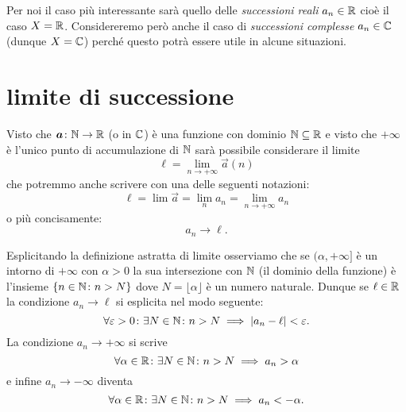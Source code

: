 Per noi il caso più interessante sarà quello delle \emph{successioni reali}
$a_n\in {\mathbb R}$ cioè il caso $X={\mathbb R}$. Considereremo però anche il caso di
\emph{successioni complesse} $a_n\in {\mathbb C}$ (dunque $X={\mathbb C}$) perché questo
potrà essere utile in alcune situazioni.%

\section{limite di successione}

Visto che $\boldsymbol a \colon {\mathbb N}\to{\mathbb R}$ (o in ${\mathbb C}$) è una funzione 
con dominio ${\mathbb N}\subseteq {\mathbb R}$ 
e visto che $+\infty$ è l'unico punto di accumulazione di ${\mathbb N}$ 
sarà possibile considerare il limite
\[
  \ell = \lim_{n\to +\infty} \vec a(n)
\]
che potremmo anche scrivere con una delle seguenti notazioni:
\[
\ell = \lim \vec a = \lim_n a_n = \lim_{n\to +\infty} a_n
\]
o più concisamente:
\[
  a_n \to \ell. 
\]

Esplicitando la definizione astratta di limite osserviamo che se $(\alpha,+\infty]$
è un intorno di $+\infty$ con $\alpha>0$ la sua intersezione con ${\mathbb N}$ (il dominio della funzione)
è l'insieme ${\left\{ n\in {\mathbb N}\colon n> N \right\}}$ dove $N=\lfloor \alpha \rfloor$ è 
un numero naturale. Dunque se $\ell \in {\mathbb R}$ 
la condizione $a_n \to \ell$ si esplicita nel modo seguente:
\begin{equation}\label{eq:limite_successione_convergente}
\forall \varepsilon>0\colon \exists N\in {\mathbb N}\colon n>N\implies {\left|a_n-\ell\right|} < \varepsilon.  
\end{equation}
La condizione $a_n\to +\infty$ si scrive
\[
  \forall \alpha\in {\mathbb R} \colon \exists N\in {\mathbb N} \colon n>N \implies a_n > \alpha  
\]
e infine $a_n\to-\infty$ diventa
\[
  \forall \alpha\in {\mathbb R} \colon \exists N\in {\mathbb N} \colon n>N \implies a_n < -\alpha.    
\]

